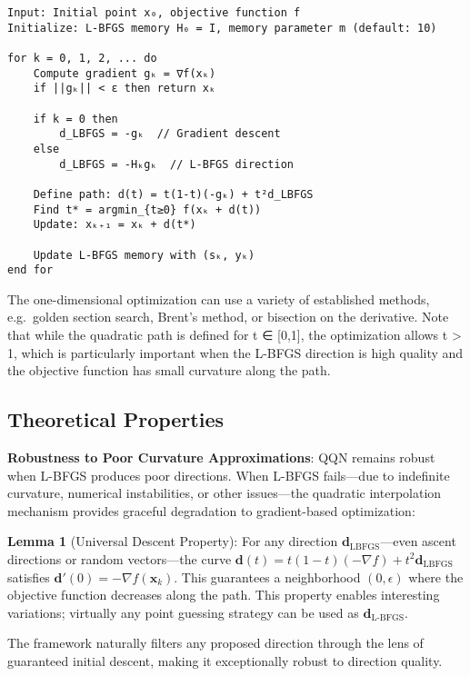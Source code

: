 \begin{verbatim}
Input: Initial point x₀, objective function f
Initialize: L-BFGS memory H₀ = I, memory parameter m (default: 10)

for k = 0, 1, 2, ... do
    Compute gradient gₖ = ∇f(xₖ)
    if ||gₖ|| < ε then return xₖ

    if k = 0 then
        d_LBFGS = -gₖ  // Gradient descent
    else
        d_LBFGS = -Hₖgₖ  // L-BFGS direction

    Define path: d(t) = t(1-t)(-gₖ) + t²d_LBFGS
    Find t* = argmin_{t≥0} f(xₖ + d(t))
    Update: xₖ₊₁ = xₖ + d(t*)

    Update L-BFGS memory with (sₖ, yₖ)
end for
\end{verbatim}

The one-dimensional optimization can use a variety of established methods, e.g.~golden section search, Brent's method, or bisection on the derivative.
Note that while the quadratic path is defined for t ∈ {[}0,1{]}, the optimization allows t \textgreater{} 1, which is particularly important when the L-BFGS direction is high quality and the objective function has small curvature along the path.

\hypertarget{theoretical-properties}{%
\subsection{Theoretical Properties}\label{theoretical-properties}}

\textbf{Robustness to Poor Curvature Approximations}: QQN remains robust when L-BFGS produces poor directions.
When L-BFGS fails---due to indefinite curvature, numerical instabilities, or other issues---the quadratic interpolation mechanism provides graceful degradation to gradient-based optimization:

\textbf{Lemma 1} (Universal Descent Property): For any direction \(\mathbf{d}_{\text{LBFGS}}\)---even ascent directions or random vectors---the curve \(\mathbf{d}(t) = t(1-t)(-\nabla f) + t^2 \mathbf{d}_{\text{LBFGS}}\) satisfies \(\mathbf{d}'(0) = -\nabla f(\mathbf{x}_k)\).
This guarantees a neighborhood \((0, \epsilon)\) where the objective function decreases along the path.
This property enables interesting variations; virtually any point guessing strategy can be used as \(\mathbf{d}_{\text{L-BFGS}}\).

The framework naturally filters any proposed direction through the lens of guaranteed initial descent, making it exceptionally robust to direction quality.

